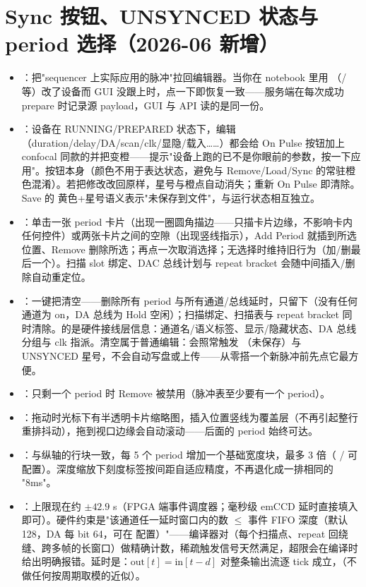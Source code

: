\documentclass[11pt,oneside,openany]{book}
\begin{document}
\section{Sync 按钮、UNSYNCED 状态与 period 选择（2026-06 新增）}

\begin{itemize}
  \item {}：把"sequencer 上实际应用的脉冲"拉回编辑器。当你在 notebook 里用 （/ 等）改了设备而 GUI 没跟上时，点一下即恢复一致——服务端在每次成功 prepare 时记录源 payload，GUI 与 API 读的是同一份。
  \item {}：设备在 RUNNING/PREPARED 状态下，编辑（duration/delay/DA/scan/clk/显隐/载入……）都会给 On Pulse 按钮加上 confocal 同款的并把变橙——提示"设备上跑的已不是你眼前的参数，按一下应用"。按钮本身（颜色不用于表达状态，避免与 Remove/Load/Sync 的常驻橙色混淆）。若把修改改回原样，星号与橙点自动消失；重新 On Pulse 即清除。Save 的  黄色+星号语义表示"未保存到文件"，与运行状态相互独立。
  \item {}：单击一张 period 卡片（出现一圈圆角描边——只描卡片边缘，不影响卡内任何控件）或两张卡片之间的空隙（出现竖线指示），Add Period 就插到所选位置、Remove 删除所选；再点一次取消选择；无选择时维持旧行为（加/删最后一个）。扫描 slot 绑定、DAC 总线计划与 repeat bracket 会随中间插入/删除自动重定位。
  \item {}：一键把清空——删除所有 period 与所有通道/总线延时，只留下（没有任何通道为 on，DA 总线为 Hold 空闲）；扫描绑定、扫描表与 repeat bracket 同时清除。的是硬件接线层信息：通道名/语义标签、显示/隐藏状态、DA 总线分组与 clk 指派。清空属于普通编辑：会照常触发 （未保存）与 UNSYNCED 星号，不会自动写盘或上传——从零搭一个新脉冲前先点它最方便。
  \item {}：只剩一个 period 时 Remove 被禁用（脉冲表至少要有一个 period）。
  \item {}：拖动时光标下有半透明卡片缩略图，插入位置竖线为覆盖层（不再引起整行重排抖动），拖到视口边缘会自动滚动——后面的 period 始终可达。
  \item {}：与纵轴的行块一致，每 5 个 period 增加一个基础宽度块，最多 3 倍（ /  可配置）。深度缩放下刻度标签按间距自适应精度，不再退化成一排相同的 "8ms"。
  \item {}：上限现在约 $\pm 42.9$ s（FPGA 端事件调度器；毫秒级 emCCD 延时直接填入即可）。硬件约束是"该通道任一延时窗口内的数 $\le$ 事件 FIFO 深度（默认 128，DA 每 bit 64，可在  配置）"——编译器对（每个扫描点、repeat 回绕缝、跨多帧的长窗口）做精确计数，稀疏触发信号天然满足，超限会在编译时给出明确报错。延时是：$\text{out}[t]=\text{in}[t-d]$ 对整条输出流逐 tick 成立，（不做任何按周期取模的近似）。
\end{itemize}
\end{document}
